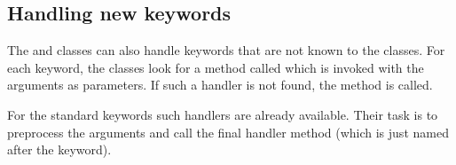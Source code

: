 \subsection{Handling new keywords}

The  and  classes can also handle
keywords that are not known to the classes. For each keyword, the
classes look for a method called
 which is invoked with the arguments as
parameters. If such a handler is not found, the 
method is called.

For the standard keywords such  handlers
are already available. Their task is to preprocess the arguments
and call the final handler method (which is just named after the
keyword).

